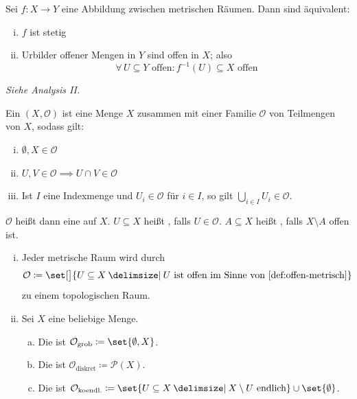 \begin{lemma}[{name=[Charakterisierung von Stetigkeit über offene Mengen]}]
	Sei $f \colon X \to Y$  eine Abbildung zwischen metrischen Räumen. Dann sind äquivalent:
	\begin{enumerate}[(i)]
		\item $f$ ist stetig
		\item Urbilder offener Mengen in $Y$ sind offen in $X$; also
		\[
			\forall \, U \subseteq Y \text{ offen} : f^{-1}(U) \subseteq X \text{ offen}
		\]
	\end{enumerate}
\end{lemma}
\begin{beweis}
	\emph{Siehe Analysis II.}
\end{beweis}

\begin{definition}[{name=[topologischer Raum]}]
	Ein  $(X, \mathcal{O})$ ist eine Menge $X$ zusammen mit einer Familie $\mathcal{O}$ von Teilmengen von $X$, sodass gilt:
	\begin{enumerate}[(i)]
		\item $\emptyset, X \in \mathcal{O}$
		\item $U,V \in \mathcal{O} \implies U \cap V \in \mathcal{O}$
		\item Ist $I$ eine Indexmenge und $U_i \in \mathcal{O}$ für $i \in I$, so gilt $\bigcup_{i \in I} U_i \in \mathcal{O}$.
	\end{enumerate}
	$\mathcal{O}$ heißt dann eine  auf $X$.
	$U \subseteq X$ heißt , falls $U \in \mathcal{O}$.
	$A \subseteq X$ heißt , falls $X \setminus A$ offen ist.
\end{definition}

\begin{beispiel}[{name=[topologische Räume]}]
	\begin{enumerate}[(i)]
		\item Jeder metrische Raum wird durch
		\[
			\mathcal{O} \coloneqq \set[\big]{U \subseteq X \given U \text{ ist offen im Sinne von \cref{def:offen-metrisch}}}
		\]
		zu einem topologischen Raum.
		\item Sei $X$ eine beliebige Menge.
		\begin{enumerate}[(a)]
			\item Die  ist $\mathcal{O}_{\text{grob}} \coloneqq \set{\emptyset, X}$.
			\item Die  ist $\mathcal{O}_{\text{diskret}} \coloneqq \mathcal{P}(X)$.
			\item Die   ist
			$\mathcal{O}_{\text{koendl.}} \coloneqq \set{U \subseteq X \given X \setminus U \text{ endlich}} \cup \set{\emptyset}$.
		\end{enumerate}
	\end{enumerate}
\end{beispiel}


